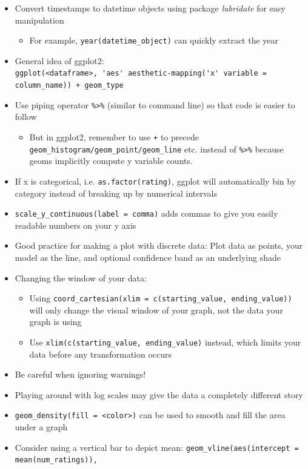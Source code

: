 \begin{itemize}
	\item Convert timestamps to datetime objects using package \emph{lubridate} for easy manipulation
	\begin{itemize}
		\item For example, \verb|year(datetime_object)| can quickly extract the year
	\end{itemize}
	\item General idea of ggplot2: \\
	\verb|ggplot(<dataframe>, 'aes' aesthetic-mapping('x' variable = column_name)) + geom_type|
	\item Use piping operator \verb|%>%| (similar to command line) so that code is easier to follow
	\begin{itemize}
		\item But in ggplot2, remember to use \verb|+| to precede \verb|geom_histogram/geom_point/geom_line| etc. instead of \verb|%>%| because geoms implicitly compute y variable counts.
	\end{itemize}
	\item If x is categorical, i.e. \verb|as.factor(rating)|, ggplot will automatically bin by category instead of breaking up by numerical  intervals
	\item \verb|scale_y_continuous(label = comma)| adds commas to give you easily readable numbers on your y axis
	\item Good practice for making a plot with discrete data: Plot data as points, your model as the line, and optional confidence band as an underlying shade
	\item Changing the window of your data:
	\begin{itemize}
		\item Using \verb|coord_cartesian(xlim = c(starting_value, ending_value))| will only change the visual window of your graph, not the data your graph is using
		\item Use \verb|xlim(c(starting_value, ending_value)| instead, which limits your data before any transformation occurs
	\end{itemize}
	\item Be careful when ignoring warnings!
	\item Playing around with log scales may give the data a completely different story
	\item \verb|geom_density(fill = <color>)| can be used to smooth and fill the area under a graph
	\item Consider using a vertical bar to depict mean: \verb|geom_vline(aes(intercept = mean(num_ratings)),| \\

\end{itemize}
